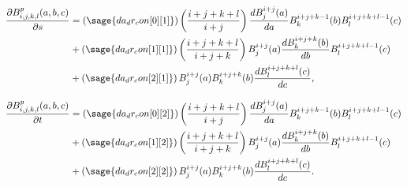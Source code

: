 \documentclass{article}
\numberwithin{equation}{section}
\begin{document}
\begin{align*}
\frac{\partial B^p_{i,j,k,l}(a,b,c)}{\partial s}
& = \left(\sage{da_dr_con[0][1]}\right)\left(\frac{i+j+k+l}{i+j}\right) \frac{d B^{i+j}_j(a)}{da} B^{i+j+k-1}_k(b) B^{i+j+k+l-1}_l(c) \\
& + \left(\sage{da_dr_con[1][1]}\right)\left(\frac{i+j+k+l}{i+j+k}\right) B^{i+j}_j(a) \frac{d B^{i+j+k}_k(b)}{db} B^{i+j+k+l-1}_l(c) \\
& + \left(\sage{da_dr_con[2][1]}\right) B^{i+j}_j(a) B^{i+j+k}_k(b) \frac{d B^{i+j+k+l}_l(c)}{dc},
\end{align*}

\begin{align*}
\frac{\partial B^p_{i,j,k,l}(a,b,c)}{\partial t}
& = \left(\sage{da_dr_con[0][2]}\right)\left(\frac{i+j+k+l}{i+j}\right) \frac{d B^{i+j}_j(a)}{da} B^{i+j+k-1}_k(b) B^{i+j+k+l-1}_l(c) \\
& + \left(\sage{da_dr_con[1][2]}\right)\left(\frac{i+j+k+l}{i+j+k}\right) B^{i+j}_j(a) \frac{d B^{i+j+k}_k(b)}{db} B^{i+j+k+l-1}_l(c) \\
& + \left(\sage{da_dr_con[2][2]}\right) B^{i+j}_j(a) B^{i+j+k}_k(b) \frac{d B^{i+j+k+l}_l(c)}{dc}.
\end{align*}





\end{document}
